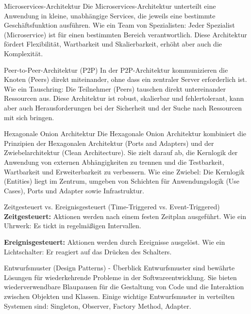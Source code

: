 \documentclass{beamer}
\begin{document}
\begin{frame}{Microservices-Architektur}
    Die Microservices-Architektur unterteilt eine Anwendung in kleine, unabhängige Services, die jeweils eine bestimmte Geschäftsfunktion ausführen.  Wie ein Team von Spezialisten:  Jeder Spezialist (Microservice) ist für einen bestimmten Bereich verantwortlich.  Diese Architektur fördert Flexibilität, Wartbarkeit und Skalierbarkeit, erhöht aber auch die Komplexität.
\end{frame}


\begin{frame}{Peer-to-Peer-Architektur (P2P)}
    In der P2P-Architektur kommunizieren die Knoten (Peers) direkt miteinander, ohne dass ein zentraler Server erforderlich ist.  Wie ein Tauschring:  Die Teilnehmer (Peers) tauschen direkt untereinander Ressourcen aus. Diese Architektur ist robust, skalierbar und fehlertolerant, kann aber auch Herausforderungen bei der Sicherheit und der Suche nach Ressourcen mit sich bringen.
\end{frame}



\begin{frame}{Hexagonale Onion Architektur}
    Die Hexagonale Onion Architektur kombiniert die Prinzipien der Hexagonalen Architektur (Ports and Adapters) und der Zwiebelarchitektur (Clean Architecture). Sie zielt darauf ab, die Kernlogik der Anwendung von externen Abhängigkeiten zu trennen und die Testbarkeit, Wartbarkeit und Erweiterbarkeit zu verbessern.  Wie eine Zwiebel:  Die Kernlogik (Entities) liegt im Zentrum, umgeben von Schichten für Anwendungslogik (Use Cases), Ports und Adapter sowie Infrastruktur.
\end{frame}



\begin{frame}{Zeitgesteuert vs. Ereignisgesteuert (Time-Triggered vs. Event-Triggered)}
    \textbf{Zeitgesteuert:} Aktionen werden nach einem festen Zeitplan ausgeführt. Wie ein Uhrwerk:  Es tickt in regelmäßigen Intervallen.

    \textbf{Ereignisgesteuert:}  Aktionen werden durch Ereignisse ausgelöst. Wie ein Lichtschalter:  Er reagiert auf das Drücken des Schalters.
\end{frame}


\begin{frame}{Entwurfsmuster (Design Patterns) - Überblick}
Entwurfsmuster sind bewährte Lösungen für wiederkehrende Probleme in der Softwareentwicklung. Sie bieten wiederverwendbare Blaupausen für die Gestaltung von Code und die Interaktion zwischen Objekten und Klassen. Einige wichtige Entwurfsmuster in verteilten Systemen sind:  Singleton, Observer, Factory Method, Adapter.
\end{frame}
\end{document}
